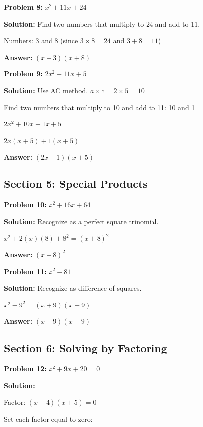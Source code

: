 \documentclass[12pt]{article}
\begin{document}
		\textbf{Problem 8:} $x^2 + 11x + 24$
		
		\textbf{Solution:} Find two numbers that multiply to 24 and add to 11.
		
		Numbers: 3 and 8 (since $3 \times 8 = 24$ and $3 + 8 = 11$)
		
		\textbf{Answer:} $(x + 3)(x + 8)$

		\vspace{0.5cm}

		\textbf{Problem 9:} $2x^2 + 11x + 5$
		
		\textbf{Solution:} Use AC method. $a \times c = 2 \times 5 = 10$
		
		Find two numbers that multiply to 10 and add to 11: 10 and 1
		
		$2x^2 + 10x + 1x + 5$
		
		$2x(x + 5) + 1(x + 5)$
		
		\textbf{Answer:} $(2x + 1)(x + 5)$

	\newpage

	\subsection*{Section 5: Special Products}

		\textbf{Problem 10:} $x^2 + 16x + 64$
		
		\textbf{Solution:} Recognize as a perfect square trinomial.
		
		$x^2 + 2(x)(8) + 8^2 = (x + 8)^2$
		
		\textbf{Answer:} $(x + 8)^2$

		\vspace{0.5cm}

		\textbf{Problem 11:} $x^2 - 81$
		
		\textbf{Solution:} Recognize as difference of squares.
		
		$x^2 - 9^2 = (x + 9)(x - 9)$
		
		\textbf{Answer:} $(x + 9)(x - 9)$

	\newpage

	\subsection*{Section 6: Solving by Factoring}

		\textbf{Problem 12:} $x^2 + 9x + 20 = 0$
		
		\textbf{Solution:}
		
		Factor: $(x + 4)(x + 5) = 0$
		
		Set each factor equal to zero:
		
\end{document}
